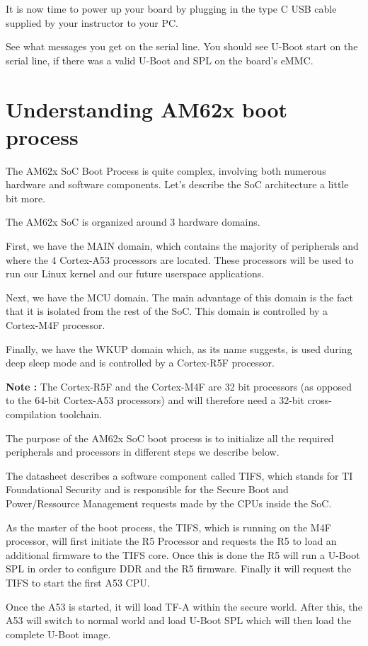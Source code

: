 It is now time to power up your board by plugging in the type C USB
cable supplied by your instructor to your PC.

See what messages you get on the serial line. You should see U-Boot
start on the serial line, if there was a valid U-Boot and SPL on the
board's eMMC.

\section{Understanding AM62x boot process}

The AM62x SoC Boot Process is quite complex, involving both numerous
hardware and software components.
Let's describe the SoC architecture a little bit more.

The AM62x SoC is organized around 3 hardware domains.

First, we have the MAIN domain, which contains the majority of peripherals and
where the 4 Cortex-A53 processors are located. These processors will be used to
run our Linux kernel and our future userspace applications.

Next, we have the MCU domain. The main advantage of this domain is the
fact that it is isolated from the rest of the SoC. This domain is
controlled by a Cortex-M4F processor.

Finally, we have the WKUP domain which, as its name suggests, is used during
deep sleep mode and is controlled by a Cortex-R5F processor.

\textbf{Note :} The Cortex-R5F and the Cortex-M4F are 32 bit processors
(as opposed to the 64-bit Cortex-A53 processors) and will therefore need
a 32-bit cross-compilation toolchain.

The purpose of the AM62x SoC boot process is to initialize all the required
peripherals and processors in different steps we describe below.

The datasheet describes a software component called TIFS, which stands for
TI Foundational Security and is responsible for the Secure
Boot and Power/Ressource Management requests made by the CPUs inside the SoC.

As the master of the boot process, the TIFS, which is running on the
M4F processor, will first initiate the R5 Processor and requests the
R5 to load an additional firmware to the TIFS core. Once this is done the
R5 will run a U-Boot SPL in order to configure DDR and the R5
firmware. Finally it will request the TIFS to start the first A53 CPU.

Once the A53 is started, it will load TF-A within the secure world.
After this, the A53 will switch to normal world and load U-Boot SPL which
will then load the complete U-Boot image.

